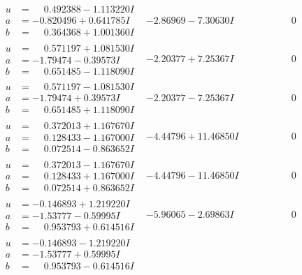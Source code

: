 \documentclass[1p]{elsarticle_modified}
\theoremstyle{definition}
\begin{document}
$$\begin{array}{c|c|c}
\begin{aligned}
u &= \phantom{-}0.492388 - 1.113220 I \\
a &= -0.820496 + 0.641785 I \\
b &= \phantom{-}0.364368 + 1.001360 I\end{aligned}
 & -2.86969 - 7.30630 I & \phantom{-0.000000 } 0 \\ \hline\begin{aligned}
u &= \phantom{-}0.571197 + 1.081530 I \\
a &= -1.79474 - 0.39573 I \\
b &= \phantom{-}0.651485 - 1.118090 I\end{aligned}
 & -2.20377 + 7.25367 I & \phantom{-0.000000 } 0 \\ \hline\begin{aligned}
u &= \phantom{-}0.571197 - 1.081530 I \\
a &= -1.79474 + 0.39573 I \\
b &= \phantom{-}0.651485 + 1.118090 I\end{aligned}
 & -2.20377 - 7.25367 I & \phantom{-0.000000 } 0 \\ \hline\begin{aligned}
u &= \phantom{-}0.372013 + 1.167670 I \\
a &= \phantom{-}0.128433 - 1.167000 I \\
b &= \phantom{-}0.072514 - 0.863652 I\end{aligned}
 & -4.44796 + 11.46850 I & \phantom{-0.000000 } 0 \\ \hline\begin{aligned}
u &= \phantom{-}0.372013 - 1.167670 I \\
a &= \phantom{-}0.128433 + 1.167000 I \\
b &= \phantom{-}0.072514 + 0.863652 I\end{aligned}
 & -4.44796 - 11.46850 I & \phantom{-0.000000 } 0 \\ \hline\begin{aligned}
u &= -0.146893 + 1.219220 I \\
a &= -1.53777 - 0.59995 I \\
b &= \phantom{-}0.953793 + 0.614516 I\end{aligned}
 & -5.96065 - 2.69863 I & \phantom{-0.000000 } 0 \\ \hline\begin{aligned}
u &= -0.146893 - 1.219220 I \\
a &= -1.53777 + 0.59995 I \\
b &= \phantom{-}0.953793 - 0.614516 I\end{aligned}

\end{array}$$
\end{document}
